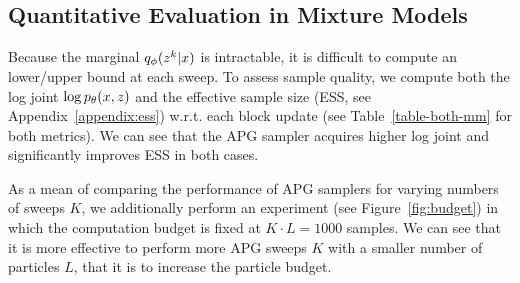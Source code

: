 \documentclass[anonymous=false, %
               format=acmsmall, %
               review=true, %
               screen=true, %
               nonacm=true]{acmart}
\theoremstyle{definition}
\begin{document}
\subsection{Quantitative Evaluation in Mixture Models}
Because the marginal $q_\phi(z^k | x)$ is intractable, it is difficult to compute an lower/upper bound at each sweep. To assess sample quality, we compute both the log joint $\log p_\theta(x, z)$ and the effective sample size (ESS, see Appendix~\ref{appendix:ess}) w.r.t. each block update (see Table~\ref{table-both-mm} for both metrics). We can see that the APG sampler acquires higher log joint and significantly improves ESS in both cases.

As a mean of comparing the performance of APG samplers for varying numbers of sweeps $K$, we additionally perform an experiment (see Figure~\ref{fig:budget}) in which the computation budget is fixed at $K \cdot L = 1000$ samples. We can see that it is more effective to perform more APG sweeps $K$ with a smaller number of particles $L$, that it is to increase the particle budget. 


\end{document}
